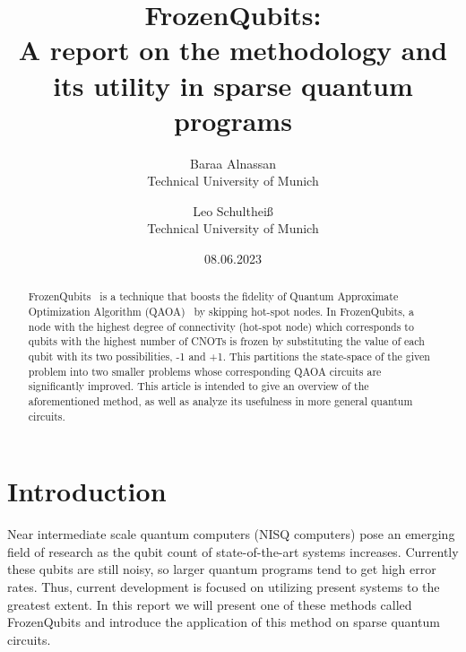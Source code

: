 

\date{08.06.2023}

\title{\Large \bf FrozenQubits:\\ A report on the methodology and its utility in sparse quantum programs}

\author{
{\rm Baraa Alnassan}\\
Technical University of Munich
\and
{\rm Leo Schultheiß}\\
Technical University of Munich
} %

\maketitle

\begin{abstract}
FrozenQubits~\cite{frozenqubits} is a technique that boosts the fidelity of Quantum Approximate Optimization Algorithm (QAOA)~\cite{qaoa} by skipping hot-spot nodes. In FrozenQubits, a node with the highest degree of connectivity (hot-spot node) which corresponds to qubits with the highest number of CNOTs is frozen by substituting the value of each qubit with its two possibilities, -1 and +1. This partitions the state-space of the given problem into two smaller problems whose corresponding QAOA circuits are significantly improved. This article is intended to give an overview of the aforementioned method, as well as analyze its usefulness in more general quantum circuits. 
\end{abstract}
\section{Introduction}
Near intermediate scale quantum computers (NISQ computers) pose an emerging field of research as the qubit count of state-of-the-art systems increases. Currently these qubits are still noisy, so larger quantum programs tend to get high error rates. Thus, current development is focused on utilizing present systems to the greatest extent. In this report we will present one of these methods called FrozenQubits and introduce the application of this method on sparse quantum circuits.
